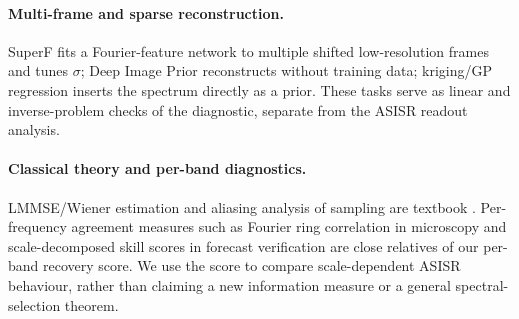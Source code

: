 \paragraph{Multi-frame and sparse reconstruction.}
SuperF \citep{superf2026} fits a Fourier-feature network to multiple shifted
low-resolution frames and tunes $\sigma$; Deep Image Prior
\citep{ulyanov2018dip} reconstructs without training data; kriging/GP
regression \citep{rasmussen2006gp} inserts the spectrum directly as a prior.
These tasks serve as linear and inverse-problem checks of the diagnostic, separate from the ASISR readout analysis.

\paragraph{Classical theory and per-band diagnostics.}
LMMSE/Wiener estimation and aliasing analysis of sampling are textbook
\citep{kay1993estimation}. Per-frequency agreement measures such as
Fourier ring correlation in microscopy \citep{vanheel2005frc} and
scale-decomposed skill scores in forecast verification are close relatives of
our per-band recovery score. We use the score to compare scale-dependent ASISR behaviour, rather than claiming a new information measure or a general spectral-selection theorem.
